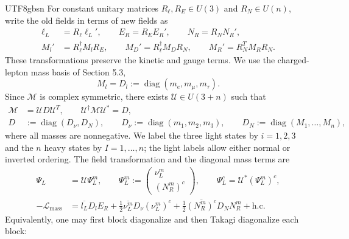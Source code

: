\documentclass[11pt,a4paper,oneside]{report}
\begin{document}
\begin{CJK*}{UTF8}{gbsn}
For constant unitary matrices $R_\ell,R_E\in U(3)$ and $R_N\in U(n)$, write the old fields in terms of new fields as
\begin{equation*}
\begin{aligned}
\ell_L&=R_\ell\ell_L',\qquad E_R=R_EE_R',\qquad N_R=R_NN_R',\\
M_l'&=R_\ell^\dagger M_lR_E,\qquad
M_D'=R_\ell^\dagger M_DR_N,\qquad
M_R'=R_N^TM_RR_N.
\end{aligned}
\tag{6.9}\label{eq:6.9}
\end{equation*}
These transformations preserve the kinetic and gauge terms. We use the charged-lepton mass basis of Section 5.3,
\begin{equation*}
M_l=D_l:=\operatorname{diag}(m_e,m_\mu,m_\tau).
\tag{6.10}\label{eq:6.10}
\end{equation*}
Since $\mathcal M$ is complex symmetric, there exists $\mathcal U\in U(3+n)$ such that
\begin{equation*}
{\displaystyle 
\begin{aligned}
\mathcal M&=\mathcal U D\mathcal U^T,\qquad
\mathcal U^\dagger\mathcal M\mathcal U^*=D,\\
D&:=\operatorname{diag}(D_\nu,D_N),\qquad
D_\nu:=\operatorname{diag}(m_1,m_2,m_3),\qquad
D_N:=\operatorname{diag}(M_1,\ldots,M_n),
\end{aligned}
}
\tag{6.11}\label{eq:6.11}
\end{equation*}
where all masses are nonnegative. We label the three light states by $i=1,2,3$ and the $n$ heavy states by $I=1,\ldots,n$; the light labels allow either normal or inverted ordering. The field transformation and the diagonal mass terms are
\begin{equation*}
\begin{aligned}
\Psi_L&=\mathcal U\Psi_L^m,\qquad
\Psi_L^m:=\begin{pmatrix}\nu_L^m\\(N_R^m)^c\end{pmatrix},\qquad
\Psi_L^c=\mathcal U^*(\Psi_L^m)^c,\\
-\mathcal L_{\mathrm{mass}}
&=\overline{l_L}D_lE_R
+\frac12\overline{\nu_L^m}D_\nu(\nu_L^m)^c
+\frac12\overline{(N_R^m)^c}D_NN_R^m+\mathrm{h.c.}
\end{aligned}
\tag{6.12}\label{eq:6.12}
\end{equation*}
Equivalently, one may first block diagonalize and then Takagi diagonalize each block:
\begin{equation*}
\begin{aligned}

\end{aligned}
\end{equation*}
\end{CJK*}
\end{document}
